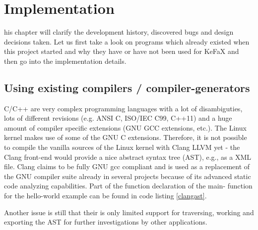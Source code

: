 \section{Implementation}
his chapter will clarify the development history, 
discovered bugs and design decisions taken.
Let us first take a look on programs 
which already existed when this project started and 
why they have or have not been used  for KeFaX 
and then go into the implementation details.

\subsection{Using existing compilers / compiler-generators}
C/C++ are very complex programming languages with a lot of disambiguties,
lots of different revisions (e.g. ANSI C, ISO/IEC C99\cite{ISOC99}, C++11) and a 
huge amount of compiler specific extensions
(GNU GCC extensions, etc.). 
The Linux kernel makes use of some of the GNU C extensions.
Therefore, it is not possible to compile the vanilla sources of the Linux kernel with Clang
LLVM yet - the Clang front-end\cite{ClangIntro} would provide a nice abstract syntax tree (AST), 
e.g., as a XML file.
Clang claims to be fully GNU gcc compliant and is
used as a replacement of the GNU compiler suite already in
several projects because of its advanced static code analyzing
capabilities. Part of the function declaration of the main-
function for the hello-world example can be found in code
listing \ref{clangast}.

Another issue is still that their is only limited support for 
traversing, working and exporting the AST for further investigations
by other applications.


